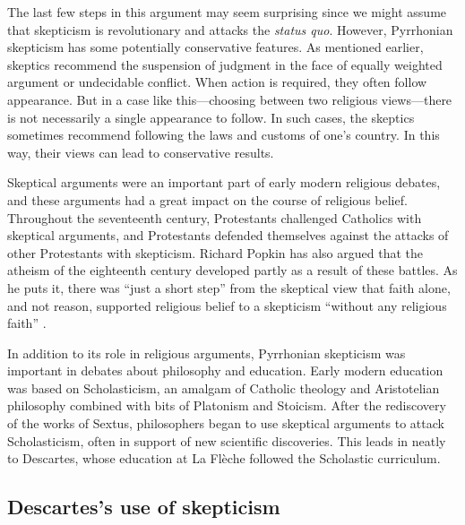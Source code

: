 The last few steps in this argument may seem surprising since we might assume that skepticism is revolutionary and attacks the \textit{status quo}. However, Pyrrhonian skepticism has some potentially conservative features. As mentioned earlier, skeptics recommend the suspension of judgment in the face of equally weighted argument or undecidable conflict. When action is required, they often follow appearance. But in a case like this---choosing between two religious views---there is not necessarily a single appearance to follow. In such cases, the skeptics sometimes recommend following the laws and customs of one's country. In this way, their views can lead to conservative results.

Skeptical arguments were an important part of early modern religious debates, and these arguments had a great impact on the course of religious belief. Throughout the seventeenth century, Protestants challenged Catholics with skeptical arguments, and Protestants defended themselves against the attacks of other Protestants with skepticism. Richard Popkin has also argued that the atheism of the eighteenth century developed partly as a result of these battles. As he puts it, there was ``just a short step'' from the skeptical view that faith alone, and not reason, supported religious belief to a skepticism ``without any religious faith'' \parencite[19]{popkin1993}.

In addition to its role in religious arguments, Pyrrhonian skepticism was important in debates about philosophy and education. Early modern education was based on Scholasticism, an amalgam of Catholic theology and Aristotelian philosophy combined with bits of Platonism and Stoicism. After the rediscovery of the works of Sextus, philosophers began to use skeptical arguments to attack Scholasticism, often in support of new scientific discoveries. This leads in neatly to Descartes, whose education at La Flèche followed the Scholastic curriculum.

\subsection*{Descartes's use of skepticism}

